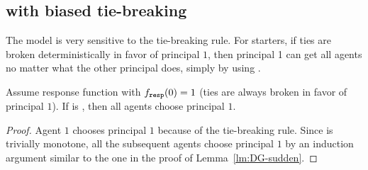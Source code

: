 %
%


\subsection{\HardMax with biased tie-breaking}
\label{sec:HardMax-biased}

The \HardMax model is very sensitive to the tie-breaking rule. For starters, if ties are  broken deterministically in favor of principal $1$, then principal 1 can get all agents no matter what the other principal does, simply by using \StaticGreedy.

\begin{theorem}\label{thm:HardMax-hardTies}
Assume \HardMax response function with $f_{\mathtt{resp}}(0)=1$ (ties are always broken in favor of principal $1$). If \alg[1] is \StaticGreedy, then all agents choose principal $1$.
\end{theorem}

\begin{proof}
Agent $1$ chooses principal $1$ because of the tie-breaking rule. Since \StaticGreedy is trivially monotone, all the subsequent agents choose principal $1$ by an induction argument similar to the one in the proof of Lemma~\ref{lm:DG-sudden}.
\end{proof}

